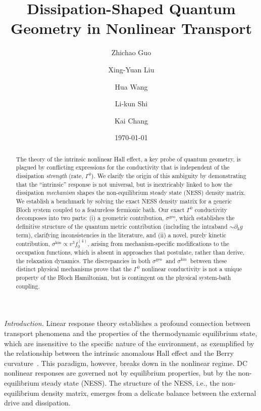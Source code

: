 \documentclass[twocolumn, prx, reprint, amsfonts, amsmath, amssymb, longbibliography, floatfix, aps]{revtex4-2}
\begin{document}
\title{Dissipation-Shaped Quantum Geometry in Nonlinear Transport}

\author{Zhichao Guo}
\author{Xing-Yuan Liu}
\author{Hua Wang}
\author{Li-kun Shi}
\author{Kai Chang}



\date{\today}

\begin{abstract}
The theory of the intrinsic nonlinear Hall effect, a key probe of quantum geometry, is plagued by conflicting expressions for the conductivity that is independent of the dissipation {\it strength} (rate, $\Gamma^0$).
We clarify the origin of this ambiguity by demonstrating that the ``intrinsic'' response is not universal, but is inextricably linked to how the dissipation {\it mechanism} shapes the non-equilibrium steady state (NESS) density matrix.
We establish a benchmark by solving the exact NESS density matrix for a generic Bloch system coupled to a featureless fermionic bath. 
Our exact $\Gamma^0$ conductivity decomposes into two parts: (i) a geometric contribution, $\sigma^{\text{geo}}$, which establishes the definitive structure of the quantum metric contribution (including the intraband $\sim \partial_k g$ term), clarifying inconsistencies in the literature, and (ii) a novel, purely kinetic contribution, $\sigma^{\text{kin}} \propto v^3 f^{(4)}_0$, arising from mechanism-specific modifications to the occupation functions, which is absent in approaches that postulate, rather than derive, the relaxation dynamics.
The discrepancies in both $\sigma^{\text {geo }}$ and $\sigma^{\text {kin }}$ between these distinct physical mechanisms prove that the $\Gamma^0$ nonlinear conductivity is not a unique property of the Bloch Hamiltonian, but is contingent on the physical system-bath coupling.
\end{abstract}

\maketitle

\bigskip

\textit{\color{blue}Introduction.}
Linear response theory establishes a profound connection between transport phenomena and the properties of the thermodynamic equilibrium state, which are insensitive to the specific nature of the environment, as exemplified by the relationship between the intrinsic anomalous Hall effect and the Berry curvature~\cite{thouless1982quantized,berry1984quantal,haldane1988model,sinitsyn2007semiclassical, nagaosa2010anomalous,xiao2010berry,resta2011insulating}. 
This paradigm, however, breaks down in the nonlinear regime.
DC nonlinear responses are governed not by equilibrium properties, but by the non-equilibrium steady state (NESS). 
The structure of the NESS, i.e., the non-equilibrium density matrix, emerges from a delicate balance between the external drive and dissipation.
\end{document}
